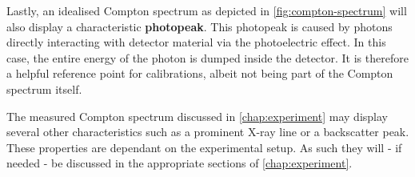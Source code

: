 Lastly, an idealised Compton spectrum as depicted in \autoref{fig:compton-spectrum}
will also display a characteristic \textbf{photopeak}. This photopeak is caused by
photons directly interacting with detector material via the photoelectric effect.
In this case, the entire energy of the photon is dumped inside the detector. It is
therefore a helpful reference point for calibrations, albeit not being part of the
Compton spectrum itself.

The measured Compton spectrum discussed in \autoref{chap:experiment} may display
several other characteristics such as a prominent X-ray line or a backscatter peak.
These properties are dependant on the experimental setup. As such they will -
if needed - be discussed in the appropriate sections of \autoref{chap:experiment}.

